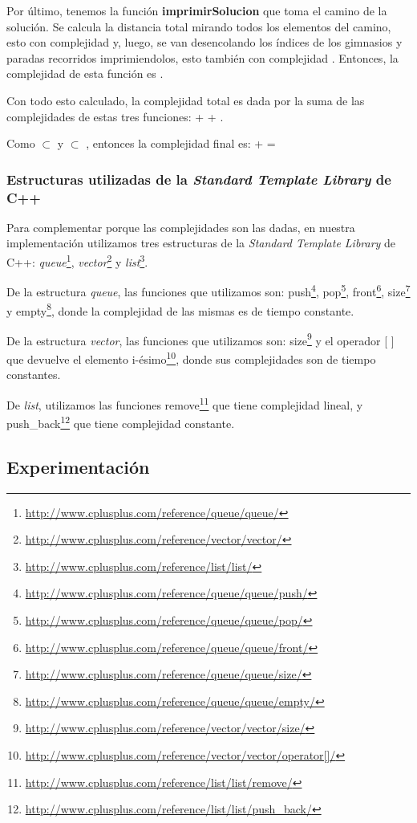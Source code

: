 Por último, tenemos la función \textbf{imprimirSolucion} que toma el camino de la solución. Se calcula la distancia total mirando todos los elementos del camino, esto con complejidad  y, luego, se van desencolando los índices de los gimnasios y paradas recorridos imprimiendolos, esto también con complejidad . Entonces, la complejidad de esta función es .


Con todo esto calculado, la complejidad total es dada por la suma de las complejidades de estas tres funciones:  +  + . 

Como  $\subset$  y  $\subset$ , entonces la complejidad final es:  +  = 

\subsubsection{Estructuras utilizadas de la \textit{Standard Template Library} de C++}

Para complementar porque las complejidades son las dadas, en nuestra implementación utilizamos tres estructuras de la \textit{Standard Template Library} de C++: \emph{queue}\footnote{\url{http://www.cplusplus.com/reference/queue/queue/}}, \emph{vector}\footnote{\url{http://www.cplusplus.com/reference/vector/vector/}} y \emph{list}\footnote{\url{http://www.cplusplus.com/reference/list/list/}}.

De la estructura \emph{queue}, las funciones que utilizamos son: push\footnote{\url{http://www.cplusplus.com/reference/queue/queue/push/}}, pop\footnote{\url{http://www.cplusplus.com/reference/queue/queue/pop/}}, front\footnote{\url{http://www.cplusplus.com/reference/queue/queue/front/}}, size\footnote{\url{http://www.cplusplus.com/reference/queue/queue/size/}} y empty\footnote{\url{http://www.cplusplus.com/reference/queue/queue/empty/}}, donde la complejidad de las mismas es de tiempo constante.

De la estructura \emph{vector}, las funciones que utilizamos son: size\footnote{\url{http://www.cplusplus.com/reference/vector/vector/size/}} y el operador [ ] que devuelve el elemento i-ésimo\footnote{\url{http://www.cplusplus.com/reference/vector/vector/operator[]/}}, donde sus complejidades son de tiempo constantes.

De \emph{list}, utilizamos las funciones remove\footnote{\url{http://www.cplusplus.com/reference/list/list/remove/}} que tiene complejidad lineal, y push\_back\footnote{\url{http://www.cplusplus.com/reference/list/list/push_back/}} que tiene complejidad constante.


\subsection{Experimentación}

